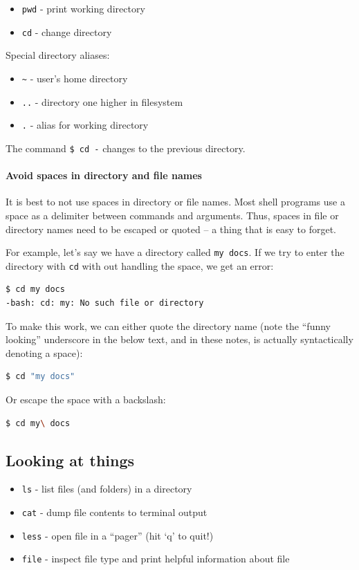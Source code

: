 \documentclass[12pt,letterpaper,twoside]{article}
\begin{document}
\begin{itemize}
\item \texttt{pwd} - print working directory
\item \texttt{cd} - change directory
\end{itemize}

Special directory aliases:

\begin{itemize}
\item \texttt{\~} - user's home directory
\item \texttt{..} - directory one higher in filesystem
\item \texttt{.} - alias for working directory
\end{itemize}

The command \texttt{\$ cd -} changes to the previous directory.

\paragraph{Avoid spaces in directory and file names} 
It is best to not use spaces in directory or file names.  Most shell programs
use a space as a delimiter between commands and arguments.  Thus, spaces in file
or directory names need to be escaped or quoted -- a thing that is easy to
forget.

For example, let's say we have a directory called \texttt{my docs}.  If we try to
enter the directory with \texttt{cd} with out handling the space, we get an error:

\begin{lstlisting}[language=bash]
$ cd my docs
-bash: cd: my: No such file or directory
\end{lstlisting}

To make this work, we can either quote the directory name (note the ``funny looking'' underscore in the below text, and in these notes, is actually syntactically denoting a space):

\begin{lstlisting}[language=bash]
$ cd "my docs"
\end{lstlisting}

Or escape the space with a backslash:

\begin{lstlisting}[language=bash]
$ cd my\ docs
\end{lstlisting}

\subsection{Looking at things}
\begin{itemize}
\item \texttt{ls} - list files (and folders) in a directory
\item \texttt{cat} - dump file contents to terminal output
\item \texttt{less} - open file in a ``pager'' (hit `q' to quit!)
\item \texttt{file} - inspect file type and print helpful information about file
\end{itemize}
\end{document}
